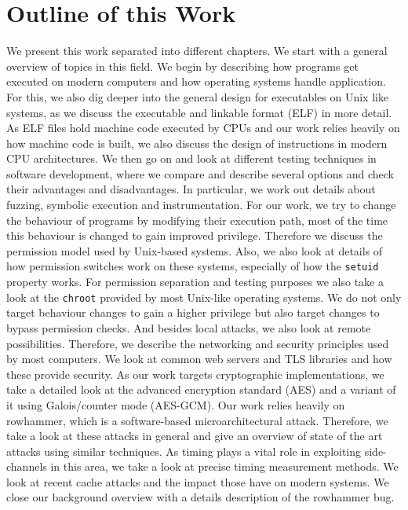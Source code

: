 \section{Outline of this Work}

We present this work separated into different chapters. We start with a general
overview of topics in this field. We begin by describing how programs get
executed on modern computers and how operating systems handle application. For
this, we also dig deeper into the general design for executables on Unix like
systems, as we discuss the executable and linkable format (ELF) in more detail.
As ELF files hold machine code executed by CPUs and our work relies heavily on
how machine code is built, we also discuss the design of instructions in modern
CPU architectures.  We then go on and look at different testing techniques in
software development, where we compare and describe several options and check
their advantages and disadvantages. In particular, we work out details about
fuzzing, symbolic execution and instrumentation. For our work, we try to change
the behaviour of programs by modifying their execution path, most of the time
this behaviour is changed to gain improved privilege. Therefore we discuss the
permission model used by Unix-based systems. Also, we also look at details of
how permission switches work on these systems, especially of how the
\texttt{setuid} property works. For permission separation and testing purposes
we also take a look at the \texttt{chroot} provided by most Unix-like operating
systems. We do not only target behaviour changes to gain a higher privilege but
also target changes to bypass permission checks. And besides local attacks, we
also look at remote possibilities. Therefore, we describe the networking and
security principles used by most computers. We look at common web servers and
TLS libraries and how these provide security. As our work targets cryptographic
implementations, we take a detailed look at the advanced encryption standard
(AES) and a variant of it using Galois/counter mode (AES-GCM). Our work relies
heavily on rowhammer, which is a software-based microarchitectural attack.
Therefore, we take a look at these attacks in general and give an overview of
state of the art attacks using similar techniques. As timing plays a vital role
in exploiting side-channels in this area, we take a look at precise timing
measurement methods. We look at recent cache attacks and the impact those have
on modern systems. We close our background overview with a details description
of the rowhammer bug.


